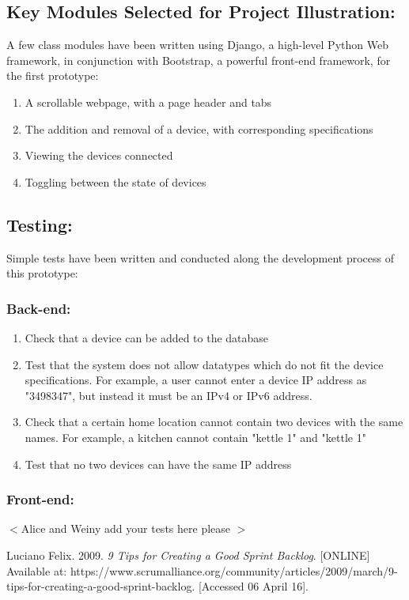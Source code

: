 \documentclass[11pt, a4paper]{article}
\begin{document}
	\subsection{Key Modules Selected for Project Illustration:}
	A few class modules have been written using Django, a high-level Python Web framework, in conjunction with Bootstrap, a powerful front-end framework, for the first prototype: 
	\begin{enumerate}
		\item A scrollable webpage, with a page header and tabs
		\item The addition and removal of a device, with corresponding specifications
		\item Viewing the devices connected
		\item Toggling between the state of devices
	\end{enumerate}
	
	\subsection{Testing:}
	Simple tests have been written and conducted along the development process of this prototype: 
	\subsubsection{Back-end:}
	\begin{enumerate}
		\item Check that a device can be added to the database
		\item Test that the system does not allow datatypes which do not fit the device specifications. For example, a user cannot enter a device IP address as "3498347", but instead it must be an IPv4 or IPv6 address. 
		\item Check that a certain home location cannot contain two devices with the same names. For example, a kitchen cannot contain "kettle 1" and "kettle 1" 
		\item Test that no two devices can have the same IP address
	\end{enumerate}
	\subsubsection{Front-end:}
	$<$Alice and Weiny add your tests here please $>$
	
\begin{thebibliography}{9}
	 Luciano Felix. 2009. \textit{9 Tips for Creating a Good Sprint Backlog}. [ONLINE] Available at: https://www.scrumalliance.org/community/articles/2009/march/9-tips-for-creating-a-good-sprint-backlog. [Accessed 06 April 16].
\end{thebibliography}
		
\end{document}
